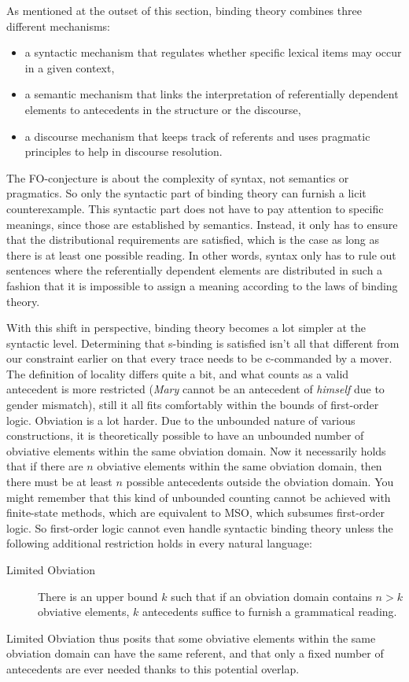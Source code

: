 As mentioned at the outset of this section, binding theory combines three different mechanisms:
%
\begin{itemize}
    \item a syntactic mechanism that regulates whether specific lexical items may occur in a given context,
    \item a semantic mechanism that links the interpretation of referentially dependent elements to antecedents in the structure or the discourse,
    \item a discourse mechanism that keeps track of referents and uses pragmatic principles to help in discourse resolution.
\end{itemize}
%
The FO-conjecture is about the complexity of syntax, not semantics or pragmatics.
So only the syntactic part of binding theory can furnish a licit counterexample.
This syntactic part does not have to pay attention to specific meanings, since those are established by semantics.
Instead, it only has to ensure that the distributional requirements are satisfied, which is the case as long as there is at least one possible reading.
In other words, syntax only has to rule out sentences where the referentially dependent elements are distributed in such a fashion that it is impossible to assign a meaning according to the laws of binding theory.

With this shift in perspective, binding theory becomes a lot simpler at the syntactic level.
Determining that s-binding is satisfied isn't all that different from our constraint earlier on that every trace needs to be c-commanded by a mover.
The definition of locality differs quite a bit, and what counts as a valid antecedent is more restricted (\emph{Mary} cannot be an antecedent of \emph{himself} due to gender mismatch), still it all fits comfortably within the bounds of first-order logic.
Obviation is a lot harder.
Due to the unbounded nature of various constructions, it is theoretically possible to have an unbounded number of obviative elements within the same obviation domain.
Now it necessarily holds that if there are $n$ obviative elements within the same obviation domain, then there must be at least $n$ possible antecedents outside the obviation domain.
You might remember that this kind of unbounded counting cannot be achieved with finite-state methods, which are equivalent to MSO, which subsumes first-order logic.
So first-order logic cannot even handle syntactic binding theory unless the following additional restriction holds in every natural language:
%
\begin{description}
    \item[Limited Obviation] There is an upper bound $k$ such that if an obviation domain contains $n > k$ obviative elements, $k$ antecedents suffice to furnish a grammatical reading.
\end{description}
%
Limited Obviation thus posits that some obviative elements within the same obviation domain can have the same referent, and that only a fixed number of antecedents are ever needed thanks to this potential overlap.

